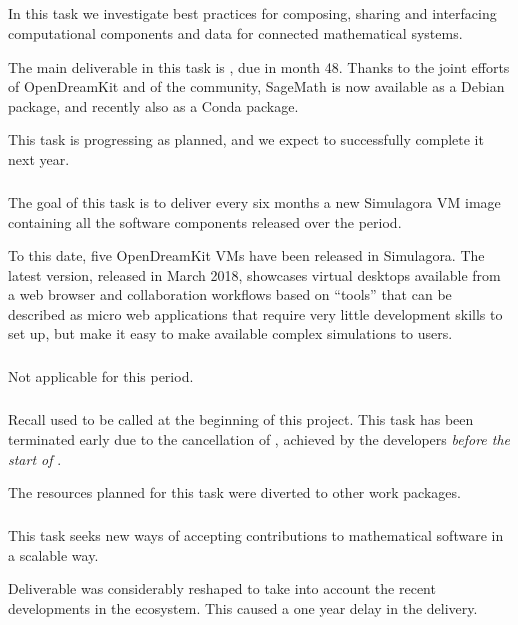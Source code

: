   
  \subparagraph{}
  \label{component-architecture@mod-packaging}
  In this task we investigate best practices for composing, sharing
  and interfacing computational components and data for connected
  mathematical systems.

  The main deliverable in this task is
  , due in month
  48. Thanks to the joint efforts of OpenDreamKit and of the
  community, SageMath is now available as a Debian package, and
  recently also as a Conda package.

  This task is progressing as planned, and we expect to successfully
  complete it next year.

  \subparagraph{}
  \label{component-architecture@simulagora-dev}
  The goal of this task is to deliver every six months a new Simulagora
  VM image containing all the software components released over the
  period.

  To this date, five OpenDreamKit VMs have been released in
  Simulagora. The latest version, released in March 2018,
  showcases virtual desktops available from a web browser and
  collaboration workflows based on ``tools'' that can be described as
  micro web applications that require very little development skills
  to set up, but make it easy to make available complex simulations to
  users.
  
  \subparagraph{}
  Not applicable for this period.

  \subparagraph{}
  \label{component-architecture@extract-smc}
  Recall \cocalc used to be called \SMC at the beginning of this project.
  This task has been terminated early due to the cancellation of
  , achieved by the
  \cocalc developers \emph{before the start of \ODK}.

  The resources planned for this task were diverted to other work
  packages.
  
  \subparagraph{}
  \label{component-architecture@workflow}
  This task seeks new ways of accepting contributions to mathematical
  software in a scalable way.

  Deliverable  was
  considerably reshaped to take into account the recent developments
  in the ecosystem. This caused a one year delay in the delivery.

